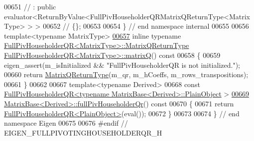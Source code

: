 \begin{DoxyCode}
00651 \textcolor{comment}{//  : public evaluator<ReturnByValue<FullPivHouseholderQRMatrixQReturnType<MatrixType> > >}
00652 \textcolor{comment}{// \{\};}
00653 
00654 \} \textcolor{comment}{// end namespace internal}
00655 
00656 \textcolor{keyword}{template}<\textcolor{keyword}{typename} MatrixType>
\hyperlink{group___q_r___module_ad26dd2d3c002939771d2375e4e051c28}{00657} \textcolor{keyword}{inline} \textcolor{keyword}{typename} \hyperlink{group___q_r___module_class_eigen_1_1_full_piv_householder_q_r}{FullPivHouseholderQR<MatrixType>::MatrixQReturnType}
       \hyperlink{group___q_r___module_ad26dd2d3c002939771d2375e4e051c28}{FullPivHouseholderQR<MatrixType>::matrixQ}()\textcolor{keyword}{ const}
00658 \textcolor{keyword}{}\{
00659   eigen\_assert(m\_isInitialized && \textcolor{stringliteral}{"FullPivHouseholderQR is not initialized."});
00660   \textcolor{keywordflow}{return} \hyperlink{group___q_r___module_struct_eigen_1_1internal_1_1_full_piv_householder_q_r_matrix_q_return_type}{MatrixQReturnType}(m\_qr, m\_hCoeffs, m\_rows\_transpositions);
00661 \}
00662 
00667 \textcolor{keyword}{template}<\textcolor{keyword}{typename} Derived>
00668 \textcolor{keyword}{const} \hyperlink{group___q_r___module_class_eigen_1_1_full_piv_householder_q_r}{FullPivHouseholderQR<typename MatrixBase<Derived>::PlainObject}
      >
\hyperlink{group___core___module_a863bc0e06b641a089508eabec6835ab2}{00669} \hyperlink{group___core___module_a863bc0e06b641a089508eabec6835ab2}{MatrixBase<Derived>::fullPivHouseholderQr}()\textcolor{keyword}{ const}
00670 \textcolor{keyword}{}\{
00671   \textcolor{keywordflow}{return} \hyperlink{group___q_r___module_class_eigen_1_1_full_piv_householder_q_r}{FullPivHouseholderQR<PlainObject>}(eval());
00672 \}
00673 
00674 \} \textcolor{comment}{// end namespace Eigen}
00675 
00676 \textcolor{preprocessor}{#endif // EIGEN\_FULLPIVOTINGHOUSEHOLDERQR\_H}
\end{DoxyCode}
